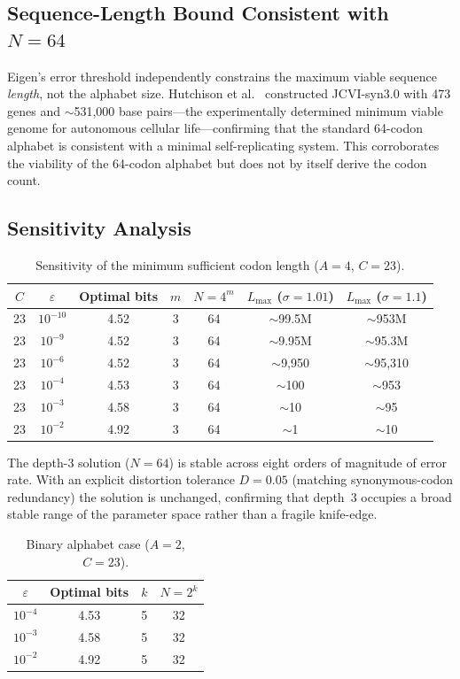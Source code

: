\documentclass[11pt]{article}
\begin{document}
\subsection{Sequence-Length Bound Consistent with $N = 64$}

Eigen's error threshold independently constrains the maximum viable sequence \emph{length}, not the alphabet size. Hutchison et al.~\cite{hutchison2016} constructed JCVI-syn3.0 with 473 genes and $\sim$531{,}000 base pairs---the experimentally determined minimum viable genome for autonomous cellular life---confirming that the standard 64-codon alphabet is consistent with a minimal self-replicating system. This corroborates the viability of the 64-codon alphabet but does not by itself derive the codon count.

\subsection{Sensitivity Analysis}

\begin{table}[ht]
\centering
\caption{Sensitivity of the minimum sufficient codon length ($A = 4$, $C = 23$).}
\label{tab:sensitivity}
\begin{tabular}{ccccccc}
\toprule
$C$ & $\varepsilon$ & Optimal bits & $m$ & $N = 4^m$ & $L_{\max}$ ($\sigma{=}1.01$) & $L_{\max}$ ($\sigma{=}1.1$) \\
\midrule
23 & $10^{-10}$ & 4.52 & 3 & 64 & $\sim$99.5M & $\sim$953M \\
23 & $10^{-9}$  & 4.52 & 3 & 64 & $\sim$9.95M & $\sim$95.3M \\
23 & $10^{-6}$  & 4.52 & 3 & 64 & $\sim$9,950 & $\sim$95,310 \\
23 & $10^{-4}$  & 4.53 & 3 & 64 & $\sim$100   & $\sim$953 \\
23 & $10^{-3}$  & 4.58 & 3 & 64 & $\sim$10    & $\sim$95 \\
23 & $10^{-2}$  & 4.92 & 3 & 64 & $\sim$1     & $\sim$10 \\
\bottomrule
\end{tabular}
\end{table}

The depth-3 solution ($N = 64$) is stable across eight orders of magnitude of error rate. With an explicit distortion tolerance $D = 0.05$ (matching synonymous-codon redundancy) the solution is unchanged, confirming that depth~3 occupies a broad stable range of the parameter space rather than a fragile knife-edge.

\begin{table}[ht]
\centering
\caption{Binary alphabet case ($A = 2$, $C = 23$).}
\label{tab:binary}
\begin{tabular}{cccc}
\toprule
$\varepsilon$ & Optimal bits & $k$ & $N = 2^k$ \\
\midrule
$10^{-4}$ & 4.53 & 5 & 32 \\
$10^{-3}$ & 4.58 & 5 & 32 \\
$10^{-2}$ & 4.92 & 5 & 32 \\
\bottomrule
\end{tabular}
\end{table}
\end{document}
